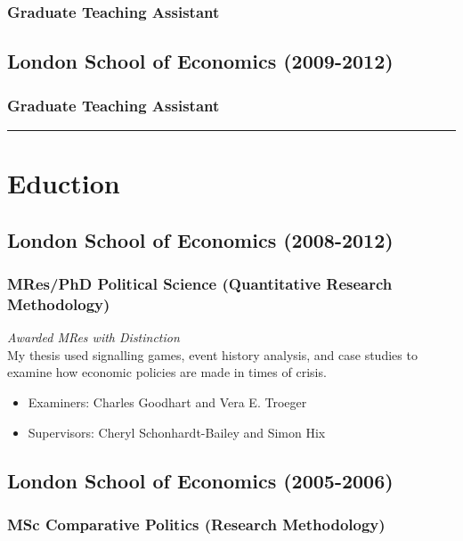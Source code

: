 \documentclass[a4paper]{article}
\begin{document}
{{\subsubsection*{Graduate Teaching Assistant}

\subsection*{London School of Economics (2009-2012)}
\subsubsection*{Graduate Teaching Assistant}

\vspace{0.25cm}
\medskip\hrule height 1pt
\vspace{0.5cm}


\section*{Eduction}

\subsection*{London School of Economics (2008-2012)}
\subsubsection*{MRes/PhD Political Science (Quantitative Research Methodology)}

\emph{Awarded MRes with Distinction} \\

\noindent My thesis used signalling games, event history analysis, and case studies to examine how economic policies are made in times of crisis.

\begin{itemize}
    \item Examiners: Charles Goodhart and Vera E. Troeger
    \item Supervisors: Cheryl Schonhardt-Bailey and Simon Hix
\end{itemize}

\subsection*{London School of Economics (2005-2006)}
\subsubsection*{MSc Comparative Politics (Research Methodology)}

}}
\end{document}
